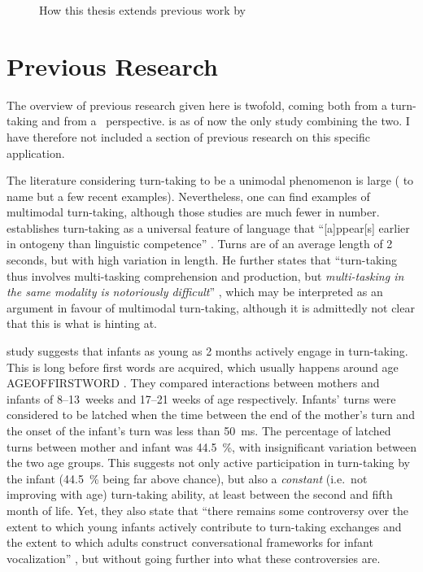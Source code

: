 \begin{figure}
	\centering
	
	\caption[How this thesis extends previous work]{How this thesis extends previous work by \citet{rohlfing18}}
	\label{fig:organisation}
\end{figure}

\section{Previous Research}
\label{sec:introductionresearch}
The overview of previous research given here is twofold, coming both from a turn-taking and from a \fpmlower\ perspective. \citet{rohlfing18} is as of now the only study combining the two. I have therefore not included a section of previous research on this specific application.


The literature considering turn-taking to be a unimodal phenomenon is large (\citep{casillas16,freud16,heldner10} to name but a few recent examples). Nevertheless, one can find examples of multimodal turn-taking, although those studies are much fewer in number.
\citet{levinson16} establishes turn-taking as a universal feature of language that ``[a]ppear[s] earlier in ontogeny than linguistic competence'' \citep[]{levinson16}. Turns are of an average length of 2 seconds, but with high variation in length. He further states that ``turn-taking thus involves multi-tasking comprehension and production, but \emph{multi-tasking in the same modality is notoriously difficult}'' \citep[, emphasis mine]{levinson16}, which may be interpreted as an argument in favour of multimodal turn-taking, although it is admittedly not clear that this is what \citeauthor{levinson16} is hinting at.%

 study suggests that infants as young as 2 months actively engage in turn-taking. This is long before first words are acquired, which usually happens around age AGEOFFIRSTWORD \citep{nosource}.  They compared interactions between mothers and infants of 8--13~weeks and 17--21 weeks of age respectively. Infants' turns were considered to be latched when the time between the end of the mother's turn and the onset of the infant's turn was less than 50~ms. The percentage of latched turns between mother and infant was 44.5~\%, with insignificant variation between the two age groups. This suggests not only active participation in turn-taking by the infant (44.5~\% being far above chance), but also a \emph{constant} (i.e.\ not improving with age) turn-taking ability, at least between the second and fifth month of life.
Yet, they also state that ``there remains some controversy over the extent to which young infants actively contribute to turn-taking exchanges and the extent to which adults construct conversational frameworks for infant vocalization'' \citep[]{gratier15}, but without going further into what these controversies are.

